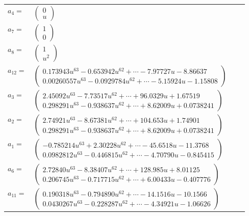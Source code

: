 \documentclass[1p]{elsarticle_modified}
\theoremstyle{definition}
\begin{document}
\begin{tabular}{m{7pt} m{180pt} m{7pt} m{180pt} }
\flushright $a_{4}=$&$\begin{pmatrix}0\\u\end{pmatrix}$ \\
\flushright $a_{7}=$&$\begin{pmatrix}1\\0\end{pmatrix}$ \\
\flushright $a_{8}=$&$\begin{pmatrix}1\\u^2\end{pmatrix}$ \\
\flushright $a_{12}=$&$\begin{pmatrix}0.173943 u^{63}-0.653942 u^{62}+\cdots-7.97727 u-8.86637\\0.00260557 u^{63}-0.0929784 u^{62}+\cdots-5.15924 u-1.15808\end{pmatrix}$ \\
\flushright $a_{3}=$&$\begin{pmatrix}2.45092 u^{63}-7.73517 u^{62}+\cdots+96.0329 u+1.67519\\0.298291 u^{63}-0.938637 u^{62}+\cdots+8.62009 u+0.0738241\end{pmatrix}$ \\
\flushright $a_{2}=$&$\begin{pmatrix}2.74921 u^{63}-8.67381 u^{62}+\cdots+104.653 u+1.74901\\0.298291 u^{63}-0.938637 u^{62}+\cdots+8.62009 u+0.0738241\end{pmatrix}$ \\
\flushright $a_{1}=$&$\begin{pmatrix}-0.785214 u^{63}+2.30228 u^{62}+\cdots-45.6518 u-11.3768\\0.0982812 u^{63}-0.446815 u^{62}+\cdots-4.70790 u-0.845415\end{pmatrix}$ \\
\flushright $a_{6}=$&$\begin{pmatrix}2.72840 u^{63}-8.38407 u^{62}+\cdots+128.985 u+8.01125\\0.206745 u^{63}-0.717715 u^{62}+\cdots+6.00433 u-0.407776\end{pmatrix}$ \\
\flushright $a_{11}=$&$\begin{pmatrix}0.190318 u^{63}-0.794890 u^{62}+\cdots-14.1516 u-10.1566\\0.0430267 u^{63}-0.228287 u^{62}+\cdots-4.34921 u-1.06626\end{pmatrix}$ \\

\end{tabular}
\end{document}
